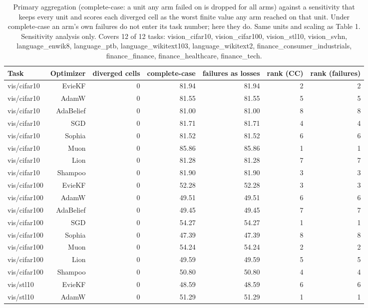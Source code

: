 \begin{table}[t]
\centering
\small
\caption{Primary aggregation (complete-case: a unit any arm failed on is dropped for all arms) against a sensitivity that keeps every unit and scores each diverged cell as the worst finite value any arm reached on that unit. Under complete-case an arm's own failures do not enter its task number; here they do. Same units and scaling as Table 1. Sensitivity analysis only. Covers 12 of 12 tasks: vision\_cifar10, vision\_cifar100, vision\_stl10, vision\_svhn, language\_enwik8, language\_ptb, language\_wikitext103, language\_wikitext2, finance\_consumer\_industrials, finance\_finance, finance\_healthcare, finance\_tech.}
\label{tab:table9b_failures_as_losses}
\begin{tabular}{lrrrrrr}
\toprule
Task & Optimizer & diverged cells & complete-case & failures as losses & rank (CC) & rank (failures) \\
\midrule
vis/cifar10 & EvieKF & 0 & 81.94 & 81.94 & 2 & 2 \\
vis/cifar10 & AdamW & 0 & 81.55 & 81.55 & 5 & 5 \\
vis/cifar10 & AdaBelief & 0 & 81.00 & 81.00 & 8 & 8 \\
vis/cifar10 & SGD & 0 & 81.71 & 81.71 & 4 & 4 \\
vis/cifar10 & Sophia & 0 & 81.52 & 81.52 & 6 & 6 \\
vis/cifar10 & Muon & 0 & 85.86 & 85.86 & 1 & 1 \\
vis/cifar10 & Lion & 0 & 81.28 & 81.28 & 7 & 7 \\
vis/cifar10 & Shampoo & 0 & 81.90 & 81.90 & 3 & 3 \\
vis/cifar100 & EvieKF & 0 & 52.28 & 52.28 & 3 & 3 \\
vis/cifar100 & AdamW & 0 & 49.51 & 49.51 & 6 & 6 \\
vis/cifar100 & AdaBelief & 0 & 49.45 & 49.45 & 7 & 7 \\
vis/cifar100 & SGD & 0 & 54.27 & 54.27 & 1 & 1 \\
vis/cifar100 & Sophia & 0 & 47.39 & 47.39 & 8 & 8 \\
vis/cifar100 & Muon & 0 & 54.24 & 54.24 & 2 & 2 \\
vis/cifar100 & Lion & 0 & 49.59 & 49.59 & 5 & 5 \\
vis/cifar100 & Shampoo & 0 & 50.80 & 50.80 & 4 & 4 \\
vis/stl10 & EvieKF & 0 & 48.59 & 48.59 & 6 & 6 \\
vis/stl10 & AdamW & 0 & 51.29 & 51.29 & 1 & 1 \\

\end{tabular}
\end{table}
